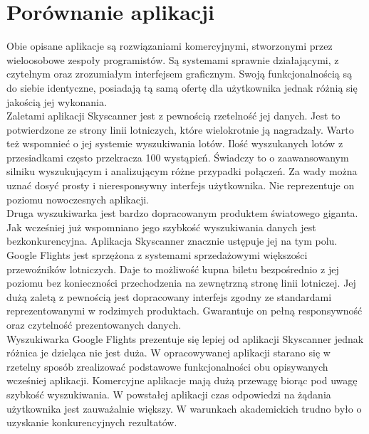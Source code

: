 \documentclass[12pt, twoside]{report}
\begin{document}
\section{Porównanie aplikacji}
Obie opisane aplikacje są rozwiązaniami komercyjnymi, stworzonymi przez wieloosobowe zespoły programistów. Są systemami sprawnie działającymi, z czytelnym oraz zrozumiałym interfejsem graficznym. Swoją funkcjonalnością są do siebie identyczne, posiadają tą samą ofertę dla użytkownika jednak różnią się jakością jej wykonania. \\ \indent
Zaletami aplikacji Skyscanner jest z pewnością rzetelność jej danych. Jest to potwierdzone ze strony linii lotniczych, które wielokrotnie ją nagradzały. Warto też wspomnieć o jej systemie wyszukiwania lotów. Ilość wyszukanych lotów z przesiadkami często przekracza 100 wystąpień. Świadczy to o zaawansowanym silniku wyszukującym i analizującym różne przypadki połączeń. Za wady można uznać dosyć prosty i nieresponsywny interfejs użytkownika. Nie reprezentuje on poziomu nowoczesnych aplikacji. \\ \indent
Druga wyszukiwarka jest bardzo dopracowanym produktem światowego giganta. Jak wcześniej już wspomniano jego szybkość wyszukiwania danych jest bezkonkurencyjna. Aplikacja Skyscanner znacznie ustępuje jej na tym polu. Google Flights jest sprzężona z systemami sprzedażowymi większości przewoźników lotniczych. Daje to możliwość kupna biletu bezpośrednio z jej poziomu bez konieczności przechodzenia na zewnętrzną stronę linii lotniczej. Jej dużą zaletą z pewnością jest dopracowany interfejs zgodny ze standardami reprezentowanymi w rodzimych produktach. Gwarantuje on pełną responsywność oraz czytelność prezentowanych danych. \\ \indent
Wyszukiwarka Google Flights prezentuje się lepiej od aplikacji Skyscanner jednak różnica je dzieląca nie jest duża. W opracowywanej aplikacji starano się w rzetelny sposób zrealizować podstawowe funkcjonalności obu opisywanych wcześniej aplikacji. Komercyjne aplikacje mają dużą przewagę biorąc pod uwagę szybkość wyszukiwania. W powstałej aplikacji czas odpowiedzi na żądania użytkownika jest zauważalnie większy. W warunkach akademickich trudno było o uzyskanie konkurencyjnych rezultatów.
\newpage
\end{document}
